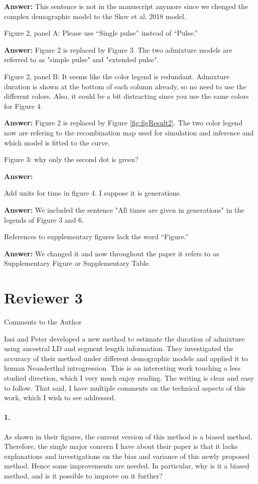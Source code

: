 \documentclass[11pt]{article}
\let\oldparagraph\paragraph
\renewcommand{\paragraph}[1]{\oldparagraph{#1}\mbox{}}
\begin{document}
\textbf{Answer:} This sentence is not in the manuscript anymore since we chenged the complex demographic model to the Skov et al. 2018 model.

Figure 2, panel A: Please use “Single pulse” instead of “Pulse.”

\textbf{Answer:} Figure 2 is replaced by Figure 3. The two admixture models are referred  to as "simple pulse" and "extended pulse".


Figure 2, panel B: It seems like the color legend is redundant. Admixture duration is shown at the bottom of each column already, so no need to use the different colors. Also, it could be a bit distracting since you use the same colors for Figure 4. 

\textbf{Answer:} Figure 2 is replaced by Figure \ref{fig:figResult2}. The two color legend now are refering to the recombination map used for simulation and inference and which model is fitted to the curve.

Figure 3: why only the second dot is green?

\textbf{Answer:} 

Add units for time in figure 4. I suppose it is generations.

\textbf{Answer:} We included the sentence "All times are given in generations" in the legends of Figure 3 and 6.

References to supplementary figures lack the word “Figure.” 

\textbf{Answer:} We changed it and now throughout the paper it refers to as Supplementary Figure or Supplementary Table.

\section{Reviewer 3}\label{Reviewer 3}

Comments to the Author

Iasi and Peter developed a new method to estimate the duration of admixture using ancestral LD and segment length information. They investigated the accuracy of their method under different demographic models and applied it to human Neanderthal introgression. This is an interesting work touching a less studied direction, which I very much enjoy reading. The writing is clear and easy to follow. That said, I have multiple comments on the technical aspects of this work, which I wish to see addressed. 

\paragraph{1.}
As shown in their figures, the current version of this method is a biased method. Therefore, the single major concern I have about their paper is that it lacks explanations and investigations on the bias and variance of this newly proposed method. Hence some improvements are needed. In particular, why is it a biased method, and is it possible to improve on it further?
\end{document}
